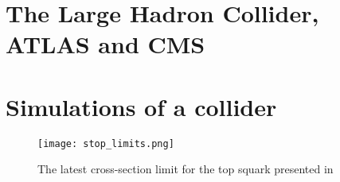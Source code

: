 \section{The Large Hadron Collider, ATLAS and CMS}


\section{Simulations of a collider}




\begin{figure}[htbp]
    \centering
    \texttt{[image: stop\_limits.png]}
    \caption{The latest cross-section limit for the top squark presented in 
    \cite{cms2019search}}
    \label{fig:limits}
\end{figure}
